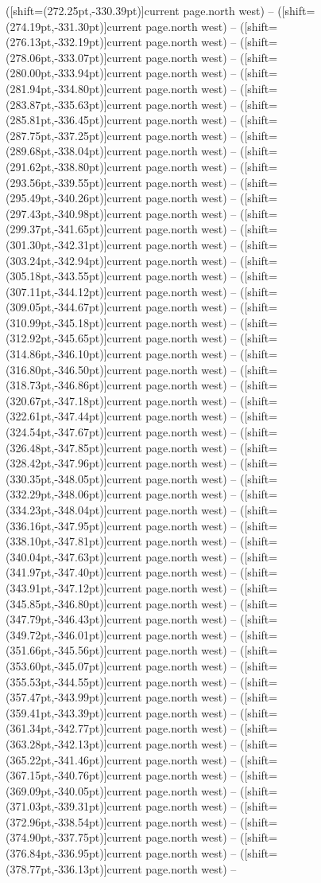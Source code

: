 \documentclass[11pt]{article}
\begin{document}
([shift={(272.25pt,-330.39pt)}]current page.north west) -- ([shift={(274.19pt,-331.30pt)}]current page.north west) -- ([shift={(276.13pt,-332.19pt)}]current page.north west) -- ([shift={(278.06pt,-333.07pt)}]current page.north west) -- ([shift={(280.00pt,-333.94pt)}]current page.north west) -- ([shift={(281.94pt,-334.80pt)}]current page.north west) -- ([shift={(283.87pt,-335.63pt)}]current page.north west) -- ([shift={(285.81pt,-336.45pt)}]current page.north west) -- ([shift={(287.75pt,-337.25pt)}]current page.north west) -- ([shift={(289.68pt,-338.04pt)}]current page.north west) -- ([shift={(291.62pt,-338.80pt)}]current page.north west) -- ([shift={(293.56pt,-339.55pt)}]current page.north west) -- ([shift={(295.49pt,-340.26pt)}]current page.north west) -- ([shift={(297.43pt,-340.98pt)}]current page.north west) -- ([shift={(299.37pt,-341.65pt)}]current page.north west) -- ([shift={(301.30pt,-342.31pt)}]current page.north west) -- ([shift={(303.24pt,-342.94pt)}]current page.north west) -- ([shift={(305.18pt,-343.55pt)}]current page.north west) -- ([shift={(307.11pt,-344.12pt)}]current page.north west) -- ([shift={(309.05pt,-344.67pt)}]current page.north west) -- ([shift={(310.99pt,-345.18pt)}]current page.north west) -- ([shift={(312.92pt,-345.65pt)}]current page.north west) -- ([shift={(314.86pt,-346.10pt)}]current page.north west) -- ([shift={(316.80pt,-346.50pt)}]current page.north west) -- ([shift={(318.73pt,-346.86pt)}]current page.north west) -- ([shift={(320.67pt,-347.18pt)}]current page.north west) -- ([shift={(322.61pt,-347.44pt)}]current page.north west) -- ([shift={(324.54pt,-347.67pt)}]current page.north west) -- ([shift={(326.48pt,-347.85pt)}]current page.north west) -- ([shift={(328.42pt,-347.96pt)}]current page.north west) -- ([shift={(330.35pt,-348.05pt)}]current page.north west) -- ([shift={(332.29pt,-348.06pt)}]current page.north west) -- ([shift={(334.23pt,-348.04pt)}]current page.north west) -- ([shift={(336.16pt,-347.95pt)}]current page.north west) -- ([shift={(338.10pt,-347.81pt)}]current page.north west) -- ([shift={(340.04pt,-347.63pt)}]current page.north west) -- ([shift={(341.97pt,-347.40pt)}]current page.north west) -- ([shift={(343.91pt,-347.12pt)}]current page.north west) -- ([shift={(345.85pt,-346.80pt)}]current page.north west) -- ([shift={(347.79pt,-346.43pt)}]current page.north west) -- ([shift={(349.72pt,-346.01pt)}]current page.north west) -- ([shift={(351.66pt,-345.56pt)}]current page.north west) -- ([shift={(353.60pt,-345.07pt)}]current page.north west) -- ([shift={(355.53pt,-344.55pt)}]current page.north west) -- ([shift={(357.47pt,-343.99pt)}]current page.north west) -- ([shift={(359.41pt,-343.39pt)}]current page.north west) -- ([shift={(361.34pt,-342.77pt)}]current page.north west) -- ([shift={(363.28pt,-342.13pt)}]current page.north west) -- ([shift={(365.22pt,-341.46pt)}]current page.north west) -- ([shift={(367.15pt,-340.76pt)}]current page.north west) -- ([shift={(369.09pt,-340.05pt)}]current page.north west) -- ([shift={(371.03pt,-339.31pt)}]current page.north west) -- ([shift={(372.96pt,-338.54pt)}]current page.north west) -- ([shift={(374.90pt,-337.75pt)}]current page.north west) -- ([shift={(376.84pt,-336.95pt)}]current page.north west) -- ([shift={(378.77pt,-336.13pt)}]current page.north west) -- 
\end{document}
